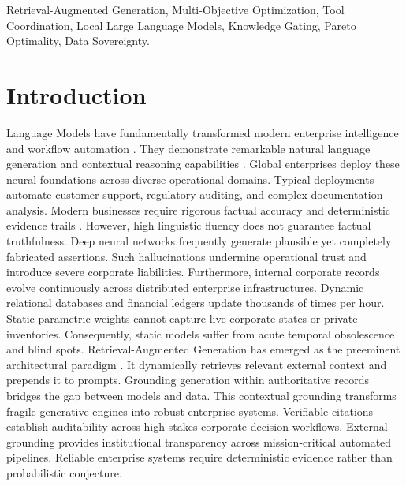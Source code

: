 \documentclass[conference,onecolumn,10pt]{IEEEtran}
\begin{document}
\begin{IEEEkeywords}
Retrieval-Augmented Generation, Multi-Objective Optimization, Tool Coordination, Local Large Language Models, Knowledge Gating, Pareto Optimality, Data Sovereignty.
\end{IEEEkeywords}

\section{Introduction}
\label{sec:introduction}

 Language Models have fundamentally transformed modern enterprise intelligence and workflow automation \cite{achiam2023gpt4,touvron2023llama}. They demonstrate remarkable natural language generation and contextual reasoning capabilities \cite{brown2020language,wei2022emergent}. Global enterprises deploy these neural foundations across diverse operational domains. Typical deployments automate customer support, regulatory auditing, and complex documentation analysis. Modern businesses require rigorous factual accuracy and deterministic evidence trails \cite{ji2023hallucination,huang2023survey}. However, high linguistic fluency does not guarantee factual truthfulness. Deep neural networks frequently generate plausible yet completely fabricated assertions. Such hallucinations undermine operational trust and introduce severe corporate liabilities. Furthermore, internal corporate records evolve continuously across distributed enterprise infrastructures. Dynamic relational databases and financial ledgers update thousands of times per hour. Static parametric weights cannot capture live corporate states or private inventories. Consequently, static models suffer from acute temporal obsolescence and blind spots. Retrieval-Augmented Generation has emerged as the preeminent architectural paradigm \cite{lewis2020rag,gao2023rag_survey}. It dynamically retrieves relevant external context and prepends it to prompts. Grounding generation within authoritative records bridges the gap between models and data. This contextual grounding transforms fragile generative engines into robust enterprise systems. Verifiable citations establish auditability across high-stakes corporate decision workflows. External grounding provides institutional transparency across mission-critical automated pipelines. Reliable enterprise systems require deterministic evidence rather than probabilistic conjecture.
\end{document}
